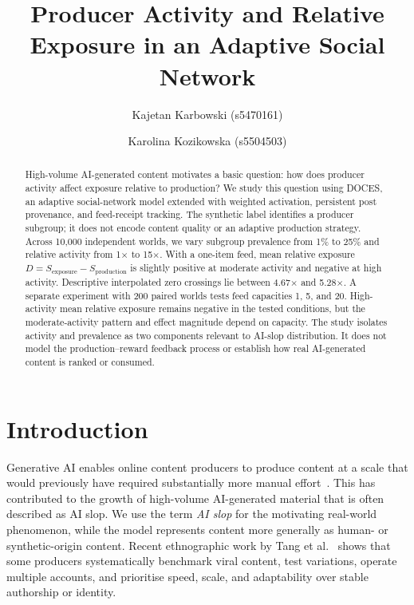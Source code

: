 \documentclass[runningheads]{llncs}
\begin{document}
%
\title{Producer Activity and Relative Exposure in an Adaptive Social Network}
%
%
\author{Kajetan Karbowski (s5470161) \and
Karolina Kozikowska (s5504503)}
%
%
%
\maketitle              %
%
\begin{abstract}
High-volume AI-generated content motivates a basic question: how does producer activity affect exposure relative to production? We study this question using DOCES, an adaptive social-network model extended with weighted activation, persistent post provenance, and feed-receipt tracking. The synthetic label identifies a producer subgroup; it does not encode content quality or an adaptive production strategy. Across 10,000 independent worlds, we vary subgroup prevalence from 1\% to 25\% and relative activity from 1\(\times\) to 15\(\times\). With a one-item feed, mean relative exposure \(D=S_{\mathrm{exposure}}-S_{\mathrm{production}}\) is slightly positive at moderate activity and negative at high activity. Descriptive interpolated zero crossings lie between 4.67\(\times\) and 5.28\(\times\). A separate experiment with 200 paired worlds tests feed capacities 1, 5, and 20. High-activity mean relative exposure remains negative in the tested conditions, but the moderate-activity pattern and effect magnitude depend on capacity. The study isolates activity and prevalence as two components relevant to AI-slop distribution. It does not model the production--reward feedback process or establish how real AI-generated content is ranked or consumed.
\end{abstract}

\section{Introduction}

Generative AI enables online content producers to produce content at a scale that would previously have required substantially more manual effort~\cite{tang2026}. This has contributed to the growth of high-volume AI-generated material that is often described as AI slop. We use the term \emph{AI slop} for the motivating real-world phenomenon, while the model represents content more generally as human- or synthetic-origin content. Recent ethnographic work by Tang et al.~\cite{tang2026} shows that some producers systematically benchmark viral content, test variations, operate multiple accounts, and prioritise speed, scale, and adaptability over stable authorship or identity.
\end{document}
